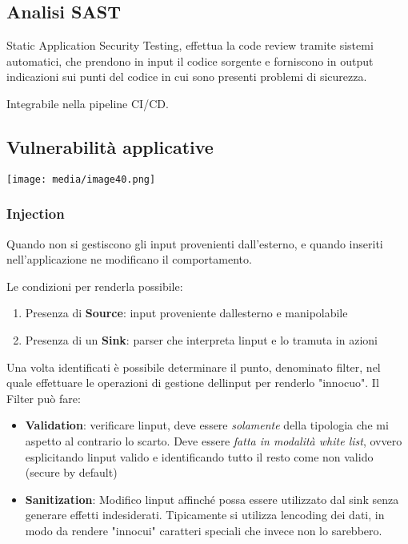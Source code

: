 \subsection{Analisi SAST}\label{analisi-sast}

Static Application Security Testing, effettua la code review tramite
sistemi automatici, che prendono in input il codice sorgente e
forniscono in output indicazioni sui punti del codice in cui sono
presenti problemi di sicurezza.

Integrabile nella pipeline CI/CD.

\subsection{Vulnerabilità
applicative}\label{vulnerabilituxe0-applicative}

\texttt{[image: media/image40.png]}

\subsubsection{Injection}\label{injection}

Quando non si gestiscono gli input provenienti dall'esterno, e quando
inseriti nell'applicazione ne modificano il comportamento.

Le condizioni per renderla possibile:

\begin{enumerate}
\def\labelenumi{\arabic{enumi}.}
\item
  Presenza di \textbf{Source}: input proveniente
  dall\textquotesingle esterno e manipolabile
\item
  Presenza di un \textbf{Sink}: parser che interpreta
  l\textquotesingle input e lo tramuta in azioni
\end{enumerate}

Una volta identificati è possibile determinare il punto, denominato
filter, nel quale effettuare le operazioni di gestione
dell\textquotesingle input per renderlo "innocuo". Il Filter può fare:

\begin{itemize}
\item
  \textbf{Validation}: verificare l\textquotesingle input, deve essere
  \emph{solamente} della tipologia che mi aspetto al contrario lo
  scarto. Deve essere \emph{fatta in modalità white list}, ovvero
  esplicitando l\textquotesingle input valido e identificando tutto il
  resto come non valido (secure by default)
\item
  \textbf{Sanitization}: Modifico l\textquotesingle input affinché possa
  essere utilizzato dal sink senza generare effetti indesiderati.
  Tipicamente si utilizza l\textquotesingle encoding dei dati, in modo
  da rendere "innocui" caratteri speciali che invece non lo sarebbero.
\end{itemize}

